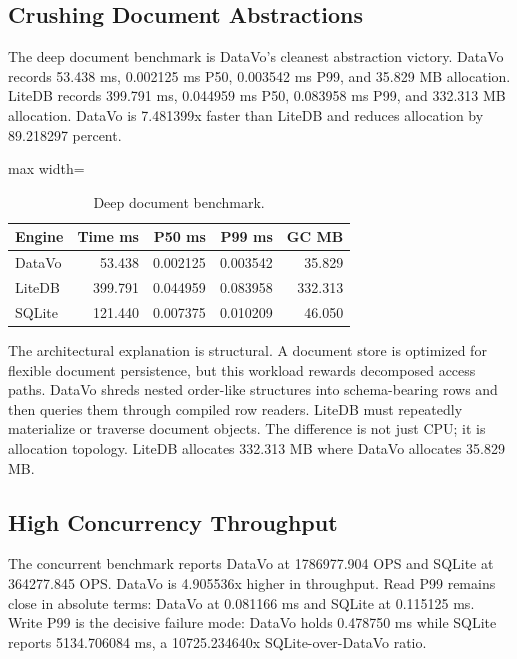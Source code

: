 \documentclass[11pt]{article}
\begin{document}
\subsection{Crushing Document Abstractions}
The deep document benchmark is DataVo's cleanest abstraction victory. DataVo records \num{53.438} ms, \num{0.002125} ms P50, \num{0.003542} ms P99, and \num{35.829} MB allocation. LiteDB records \num{399.791} ms, \num{0.044959} ms P50, \num{0.083958} ms P99, and \num{332.313} MB allocation. DataVo is 7.481399x faster than LiteDB and reduces allocation by 89.218297 percent.

\begin{table}[H]
\caption{Deep document benchmark.}
\label{tab:document}
\centering
\small
\begin{adjustbox}{max width=\textwidth}
\begin{tabular}{lrrrr}
\toprule
Engine & Time ms & P50 ms & P99 ms & GC MB \\
\midrule
DataVo & 53.438 & 0.002125 & 0.003542 & 35.829 \\
LiteDB & 399.791 & 0.044959 & 0.083958 & 332.313 \\
SQLite & 121.440 & 0.007375 & 0.010209 & 46.050 \\
\bottomrule
\end{tabular}
\end{adjustbox}
\end{table}

The architectural explanation is structural. A document store is optimized for flexible document persistence, but this workload rewards decomposed access paths. DataVo shreds nested order-like structures into schema-bearing rows and then queries them through compiled row readers. LiteDB must repeatedly materialize or traverse document objects. The difference is not just CPU; it is allocation topology. LiteDB allocates \num{332.313} MB where DataVo allocates \num{35.829} MB.

\subsection{High Concurrency Throughput}
The concurrent benchmark reports DataVo at \num{1786977.904} OPS and SQLite at \num{364277.845} OPS. DataVo is 4.905536x higher in throughput. Read P99 remains close in absolute terms: DataVo at \num{0.081166} ms and SQLite at \num{0.115125} ms. Write P99 is the decisive failure mode: DataVo holds \num{0.478750} ms while SQLite reports \num{5134.706084} ms, a 10725.234640x SQLite-over-DataVo ratio.
\end{document}
